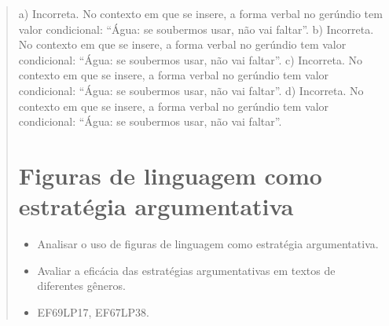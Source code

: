 {\begin{quote}
{a) Incorreta. No contexto em que se insere, a forma verbal no gerúndio tem valor condicional: 
``Água: se soubermos usar, não vai faltar''. 
b) Incorreta. No contexto em que se insere, a forma verbal no gerúndio tem valor condicional: 
``Água: se soubermos usar, não vai faltar''. 
c) Incorreta. No contexto em que se insere, a forma verbal no gerúndio tem valor condicional: 
``Água: se soubermos usar, não vai faltar''.
d) Incorreta. No contexto em que se insere, a forma verbal no gerúndio tem valor condicional: 
``Água: se soubermos usar, não vai faltar''.}  

\chapter{Figuras de linguagem como estratégia argumentativa}


\begin{itemize}
  
  \item Analisar o uso de figuras de linguagem como estratégia argumentativa.

  \item Avaliar a eficácia das estratégias argumentativas em textos de diferentes gêneros.

\end{itemize}


\begin{itemize}

  \item EF69LP17, EF67LP38.

\end{itemize}

\end{quote}}
